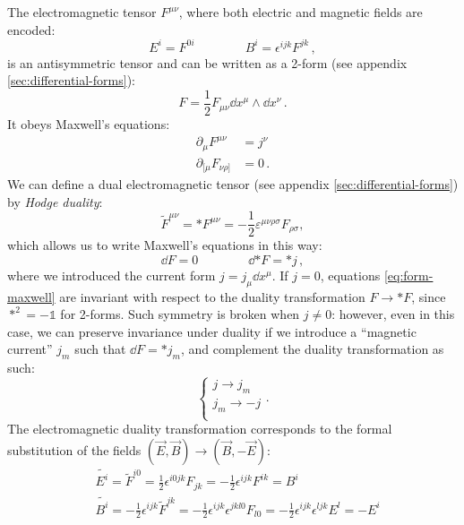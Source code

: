 \documentclass[main.tex]{subfiles}
\begin{document}
The electromagnetic tensor $F^{\mu \nu}$, where both electric and magnetic fields are encoded:
%
\begin{equation}
E^i=F^{0i} \qquad \qquad B^i=\epsilon^{ijk}F^{jk}\,,
\end{equation}
%
is an antisymmetric tensor and can be written as a 2-form (see appendix \ref{sec:differential-forms}): 
%
\begin{equation}
F = \frac{1}{2} F_{\mu\nu}\dd{x^\mu} \wedge \dd{x^\nu}
\,.
\end{equation}
%
It obeys Maxwell's equations:
%
\begin{subequations} \label{Maxwell}
\begin{align}
\partial_{\mu}F^{\mu \nu}&= j^\nu \label{maxwell-nonhom} \\
\partial_{[\mu} F_{\nu\rho]} &=0 \label{maxwell-hom} \,.
\end{align}
\end{subequations}
We can define a dual electromagnetic tensor (see appendix \ref{sec:differential-forms}) by \emph{Hodge duality}: 
\begin{equation}
\tilde{F}^{\mu\nu}=*F^{\mu\nu}=-\frac{1}{2}\varepsilon^{\mu \nu \rho \sigma}F_{\rho \sigma},
\end{equation}
%
%
which allows us to write Maxwell's equations in this way: 
%
\begin{equation} \label{eq:form-maxwell}
    \dd{F} = 0 \qquad  \qquad \dd{*F} = * j\,,
\end{equation}
%
where we introduced the current form $j = j_\mu \dd{x^\mu}$.
%
If $j=0$, equations \eqref{eq:form-maxwell} are invariant with respect to the duality transformation $F \rightarrow *F$, since $*^2 = -\mathbb{1}$ for 2-forms. Such symmetry is broken when $j\neq 0$: however, even in this case, we can preserve invariance under duality if we introduce a ``magnetic current'' $j_m$ such that $\dd{F} = *j_m$, and complement the duality transformation as such:
\begin{equation}
\begin{cases}
j \rightarrow j_m \\
j_m \rightarrow -j \\
\end{cases}.
\end{equation}
%
The electromagnetic duality transformation corresponds to the formal substitution of the fields $(\vec E,\vec B)\to(\vec B,-\vec E)$:
%
\begin{subequations}
\begin{align}
&\tilde{E^i}=\tilde{F}^{i0}=\frac{1}{2}\epsilon^{i0jk}F_{jk}=-\frac{1}{2}\epsilon^{ijk}F^{ik}=B^i\\
&\tilde{B^i}=-\frac{1}{2}\epsilon^{ijk}\tilde{F}^{jk}=-\frac{1}{2}\epsilon^{ijk}\epsilon^{jkl0}F_{l0}=-\frac{1}{2}\epsilon^{ijk}\epsilon^{ljk}E^l=-E^i
\end{align}
\end{subequations}
\end{document}
